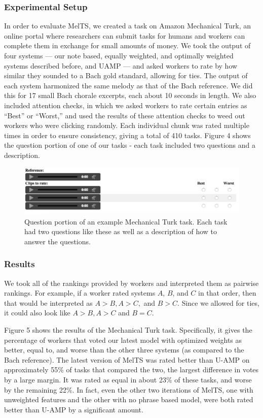 \documentclass{sig-alternate}
\begin{document}
\subsubsection{Experimental Setup}
In order to evaluate MelTS, we created a task on Amazon Mechanical Turk, an online portal where researchers can submit tasks for humans and workers can complete them in exchange for small amounts of money. We took the output of four systems --- our note based, equally weighted, and optimally weighted systems described before, and UAMP \cite{UAMP} --- and asked workers to rate by how similar they sounded to a Bach gold standard, allowing for ties. The output of each system harmonized the same melody as that of the Bach reference. We did this for 17 small Bach chorale excerpts, each about 10 seconds in length. We also included attention checks, in which we asked workers to rate certain entries as ``Best'' or ``Worst,'' and used the results of these attention checks to weed out workers who were clicking randomly. Each individual chunk was rated multiple times in order to ensure consistency, giving a total of 410 tasks. Figure 4 shows the question portion of one of our tasks - each task included two questions and a description.

\begin{figure}
\includegraphics[scale=0.3]{mturk_task}
\caption{Question portion of an example Mechanical Turk task. Each task had two questions like these as well as a description of how to answer the questions.}
\end{figure}

\subsubsection{Results}
We took all of the rankings provided by workers and interpreted them as pairwise rankings. For example, if a worker rated systems $A$, $B$, and $C$ in that order, then that would be interpreted as $A>B, A>C,$ and $B>C$. Since we allowed for ties, it could also look like $A>B, A>C$ and $B=C$. 

Figure 5 shows the results of the Mechanical Turk task. Specifically, it gives the percentage of workers that voted our latest model with optimized weights as better, equal to, and worse than the other three systems (as compared to the Bach reference). The latest version of MelTS was rated better than U-AMP\cite{UAMP} on approximately 55\% of tasks that compared the two, the largest difference in votes by a large margin. It was rated as equal in about 23\% of these tasks, and worse by the remaining 22\%. In fact, even the other two iterations of MelTS, one with unweighted features and the other with no phrase based model, were both rated better than U-AMP by a significant amount.
\end{document}
